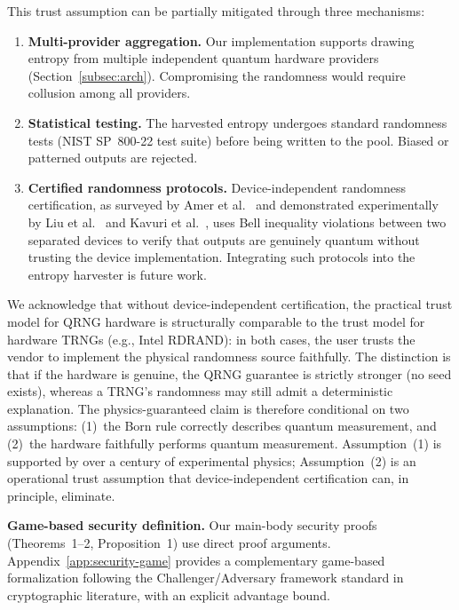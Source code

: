 \documentclass[journal]{IEEEtran}
\begin{document}
This trust assumption can be partially mitigated through three mechanisms:

\begin{enumerate}
\item \textbf{Multi-provider aggregation.} Our implementation supports drawing entropy from multiple independent quantum hardware providers (Section~\ref{subsec:arch}). Compromising the randomness would require collusion among all providers.

\item \textbf{Statistical testing.} The harvested entropy undergoes standard randomness tests (NIST SP~800-22 test suite) before being written to the pool. Biased or patterned outputs are rejected.

\item \textbf{Certified randomness protocols.} Device-independent randomness certification, as surveyed by Amer et al.~\cite{amer2025certified} and demonstrated experimentally by Liu et al.~\cite{liu2025certified} and Kavuri et al.~\cite{kavuri2025traceable}, uses Bell inequality violations between two separated devices to verify that outputs are genuinely quantum without trusting the device implementation. Integrating such protocols into the entropy harvester is future work.
\end{enumerate}

We acknowledge that without device-independent certification, the practical trust model for QRNG hardware is structurally comparable to the trust model for hardware TRNGs (e.g., Intel RDRAND): in both cases, the user trusts the vendor to implement the physical randomness source faithfully. The distinction is that if the hardware is genuine, the QRNG guarantee is strictly stronger (no seed exists), whereas a TRNG's randomness may still admit a deterministic explanation. The physics-guaranteed claim is therefore conditional on two assumptions: (1)~the Born rule correctly describes quantum measurement, and (2)~the hardware faithfully performs quantum measurement. Assumption~(1) is supported by over a century of experimental physics; Assumption~(2) is an operational trust assumption that device-independent certification can, in principle, eliminate.

\textbf{Game-based security definition.} Our main-body security proofs (Theorems~1--2, Proposition~1) use direct proof arguments. Appendix~\ref{app:security-game} provides a complementary game-based formalization following the Challenger/Adversary framework standard in cryptographic literature, with an explicit advantage bound.
\end{document}
